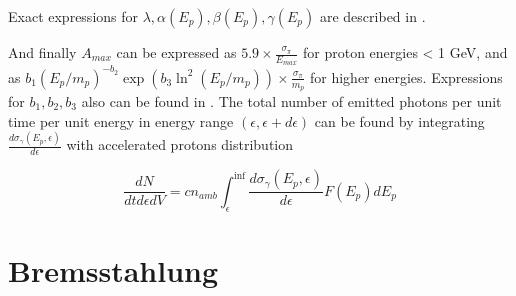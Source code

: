 Exact expressions for $\lambda, \alpha(E_p), \beta(E_p), \gamma(E_p)$ are described in \cite{Kafexhiu}.

And finally $A_{max}$ can be expressed as $5.9\times\frac{\sigma_{\pi}}{E_{max}}$ for proton energies < 1 GeV, and as $b_1 \left(E_p/m_p\right)^{-b_2}\exp\left(b_3 \ln^2\left(E_p/m_p\right)\right)\times\frac{\sigma_{\pi}}{m_p}$ for higher energies. Expressions for $b_1, b_2, b_3$ also can be found in \cite{Kafexhiu}. The total number of emitted photons per unit time per unit energy in energy range $\left(\epsilon, \epsilon + d\epsilon\right)$ can be found by integrating $\frac{d\sigma_{\gamma}\left(E_p, \epsilon\right)}{d\epsilon}$ with accelerated protons distribution

\begin{equation}
	\frac{dN}{dt d\epsilon dV} = c n_{amb} \int_{\epsilon}^{\inf}\frac{d\sigma_{\gamma}\left(E_p, \epsilon\right)}{d\epsilon} F(E_p) dE_p
\end{equation} 





\section{Bremsstahlung}